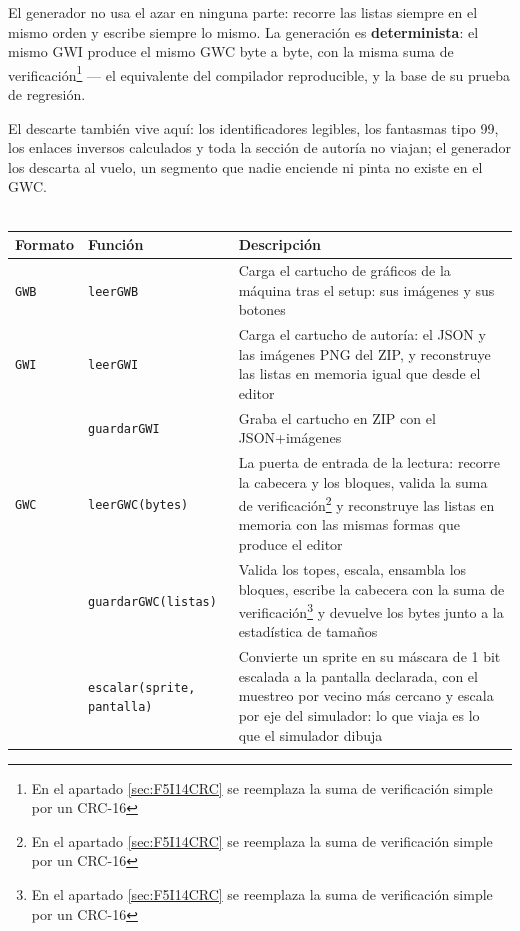 El generador no usa el azar en ninguna parte: recorre las listas
siempre en el mismo orden y escribe siempre lo mismo. La generación
es \textbf{determinista}: el mismo GWI produce el mismo GWC byte a
byte, con la misma suma de verificación\footnote{En el apartado \ref{sec:F5I14CRC} se reemplaza la suma de verificación simple por un CRC-16} — el equivalente del
compilador reproducible, y la base de su prueba de regresión.

El descarte también vive aquí: los identificadores legibles, los
fantasmas tipo 99, los enlaces inversos calculados y toda la sección
de autoría no viajan; el generador los descarta al vuelo, un
segmento que nadie enciende ni pinta no existe en el GWC.\\\

\begin{table}[H]
	\centering
	\begin{tabularx}{\textwidth}{@{}l l X@{}}
		\toprule
		\textbf{Formato} & \textbf{Función} & \textbf{Descripción} \\
		\midrule
		
		\texttt{GWB} & \texttt{leerGWB} & Carga el cartucho de gráficos de
		la máquina tras el setup: sus imágenes y sus botones \\
		\midrule
		
		\texttt{GWI} & \texttt{leerGWI} & Carga el cartucho de autoría: el
		JSON y las imágenes PNG del ZIP, y reconstruye las listas en
		memoria igual que desde el editor \\
		
		& \texttt{guardarGWI} & Graba el cartucho en ZIP con el JSON+imágenes \\
		\midrule
		
		\texttt{GWC} & \texttt{leerGWC(bytes)} & La puerta de entrada de la lectura:
		recorre la cabecera y los bloques, valida la suma de
		verificación\footnote{En el apartado \ref{sec:F5I14CRC} se reemplaza la suma de verificación simple por un CRC-16} y reconstruye las listas en memoria con las
		mismas formas que produce el editor \\
		
		& \texttt{guardarGWC(listas)} & Valida los topes, escala, ensambla los bloques, escribe la cabecera con la suma de verificación\footnote{En el apartado \ref{sec:F5I14CRC} se reemplaza la suma de verificación simple por un CRC-16} y devuelve los bytes junto a la estadística de tamaños \\
		
		& \texttt{escalar(sprite, pantalla)} & Convierte un sprite en su
		máscara de 1 bit escalada a la pantalla declarada, con el
		muestreo por vecino más cercano y escala por eje del
		simulador: lo que viaja es lo que el simulador dibuja \\
		

\end{tabularx}
\end{table}
